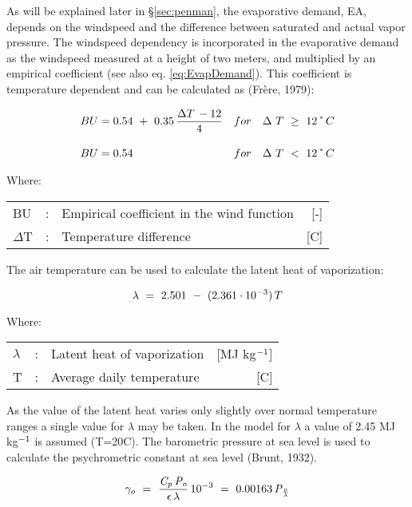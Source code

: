 As will be explained later in \S \ref{sec:penman}, the evaporative demand, EA, depends on the 
windspeed and the difference between saturated and actual vapor pressure. The windspeed
dependency is incorporated in the evaporative demand as the windspeed measured at a
height of two meters, and multiplied by an empirical coefficient (see also eq. 
\ref{eq:EvapDemand}). This
coefficient is temperature dependent and can be calculated as (Fr\`{e}re, 1979):

\begin{align}
\label{eq:BU}
BU &= 0.54 ~+ ~0.35\,{\frac{\Delta T\, - 12}{4}} & for~~~\Delta ~ T~\ge ~ 12 \degrees C \\[1em]
\nonumber
BU &= 0.54 & for~~~\Delta ~ T~<~12 \degrees C
\end{align}

Where:\\[5pt]
\begin{tabularx}{\textwidth}{llXr}
	BU & :& Empirical coefficient in the wind function &  [-]\\
	$\Delta$T& :& Temperature difference & [\degrees C] \\
\end{tabularx}
\hspace*{6em}

The air temperature can be used to calculate the latent heat of vaporization: 

\begin{equation}
{\it \lambda} ~=~ 2.501~ -~ (2.361 \cdot 10^{-3} )\, T
\end{equation}

Where:\\[5pt]
\begin{tabularx}{\textwidth}{llXr}
	$\lambda$& :& Latent heat of vaporization & [MJ kg$^{{\rm -1}}$]\\
	T &:& Average daily temperature & [\degrees C]\\
\end{tabularx}


As the value of the latent heat varies only slightly over normal temperature ranges a
single value for $\lambda$ may be taken. In the model for $\lambda$ a value of 2.45 MJ 
kg$^{{\rm -1}}$ is assumed (T=20\degrees C). The barometric pressure at sea level is 
used to calculate the psychrometric constant at sea level (Brunt, 1932).

\begin{equation}
\gamma _{o} ~=~ {{\frac{\it C _{p} \, P _{o} }{{\it  \epsilon \, \lambda } }} }\, 10 ^{-3} ~=~ 0.00163\,{\it P} _{\frac{o}{\it \lambda}} 
\end{equation}

